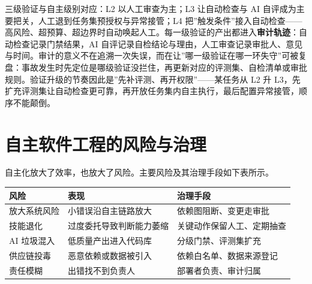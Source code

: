 \documentclass[
]{ctexbook}
\newcounter{none}
\begin{document}
三级验证与自主级别对应：L2 以人工审查为主；L3 让自动检查与 AI
自评成为主要把关，人工退到任务集预授权与异常接管；L4
把''触发条件''接入自动检查------高风险、超预算、超边界时自动唤起人工。每一级验证的产出都进入\textbf{审计轨迹}：自动检查记录门禁结果，AI
自评记录自检结论与理由，人工审查记录审批人、意见与时间。审计的意义不在追溯一次失误，而在让''哪一级验证在哪一环失守''可被复盘：事故发生时先定位是哪级验证没拦住，再更新对应的评测集、自检清单或审批规则。验证升级的节奏因此是''先补评测、再开权限''------某任务从
L2 升
L3，先扩充评测集让自动检查更可靠，再开放任务集内自主执行，最后配置异常接管，顺序不能颠倒。

\section{自主软件工程的风险与治理}\label{ux81eaux4e3bux8f6fux4ef6ux5de5ux7a0bux7684ux98ceux9669ux4e0eux6cbbux7406}

自主化放大了效率，也放大了风险。主要风险及其治理手段如下表所示。

{\def\LTcaptype{none} %
\begin{longtable}[]{@{}lll@{}}
\toprule\noalign{}
风险 & 表现 & 治理手段 \\
\midrule\noalign{}
\endhead
\bottomrule\noalign{}
\endlastfoot
放大系统风险 & 小错误沿自主链路放大 & 依赖图阻断、变更走审批 \\
技能退化 & 过度委托导致判断能力萎缩 & 关键动作保留人工、定期抽查 \\
AI 垃圾混入 & 低质量产出进入代码库 & 分级门禁、评测集扩充 \\
供应链投毒 & 恶意依赖或数据被引入 & 依赖白名单、数据来源登记 \\
责任模糊 & 出错找不到负责人 & 部署者负责、审计归属 \\
\end{longtable}
}
\end{document}
